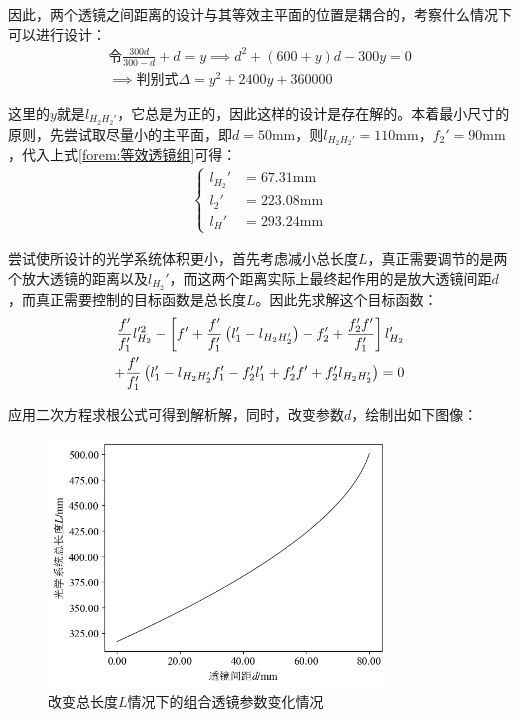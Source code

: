 \documentclass[11pt]{article}
\begin{document}
因此，两个透镜之间距离的设计与其等效主平面的位置是耦合的，考察什么情况下可以进行设计：
\begin{align*}
  \text{令}\frac{300d}{300-d}+d=y\implies d^2+(600+y)d-300y=0 \\
  \implies\text{判别式}\Delta=y^2+2400y+360000
\end{align*}
\par
这里的$y$就是$l_{H_2H_2'}$，它总是为正的，因此这样的设计是存在解的。本着最小尺寸的原则，先尝试取尽量小的主平面，即$d=50\unit{\mm}$，则$l_{H_2H_2'}=110\unit{\mm}$，$f_2'=90\unit{\mm}$，代入上式\ref{forem:等效透镜组}可得：
\begin{align*}
  \left\{
  \begin{aligned}
    l_{H_2}' & =67.31\unit{\mm}  \\
    l_2'     & =223.08\unit{\mm} \\
    l_H'     & =293.24\unit{\mm}
  \end{aligned}
  \right.
\end{align*}
\par
尝试使所设计的光学系统体积更小，首先考虑减小总长度$L$，真正需要调节的是两个放大透镜的距离以及$l_{H_2}'$，而这两个距离实际上最终起作用的是放大透镜间距$d$，而真正需要控制的目标函数是总长度$L$。因此先求解这个目标函数：
\begin{align*}
  \frac{f'}{f_1'}l_{H_2}'^2-\left[f'+\frac{f'}{f_1'}\left(l_1'-l_{H_2H_2'}\right)-f_2'+\frac{f_2'f'}{f_1'}\right]l_{H_2}' \\
  +\frac{f'}{f_1'}\left(l_1'-l_{H_2H_2'}f_1'-f_2'l_1'+f_2'f'+f_2'l_{H_2H_2'}\right)=0
\end{align*}
\par
应用二次方程求根公式可得到解析解，同时，改变参数$d$，绘制出如下图像：
\begin{figure}[H]
  \centering
  \includegraphics[width=0.8\textwidth]{光学设计，改变总长，d-L.png}
  \caption{改变总长度$L$情况下的组合透镜参数变化情况}
  \label{fig:改变总长，l_2'和l_{H_2}'}
\end{figure}
\end{document}
